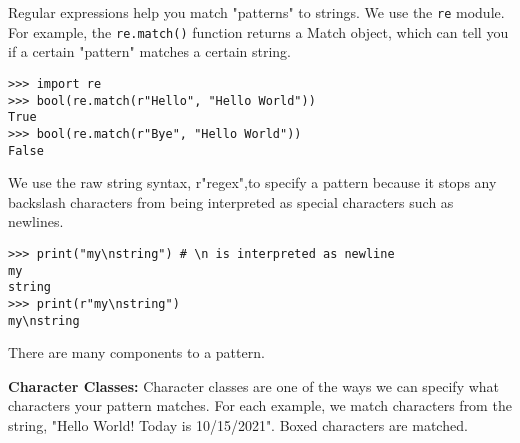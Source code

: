 Regular expressions help you match "patterns" to strings. We use the \lstinline{re} module.
For example, the \lstinline{re.match()} function returns a Match object, which can tell you if a certain "pattern" matches a certain string.

\begin{lstlisting}
>>> import re
>>> bool(re.match(r"Hello", "Hello World"))
True
>>> bool(re.match(r"Bye", "Hello World"))
False
\end{lstlisting}

We use the raw string syntax, r"regex",to specify a pattern because
it stops any backslash characters from being interpreted as special characters such as newlines.

\begin{lstlisting}
>>> print("my\nstring") # \n is interpreted as newline
my
string
>>> print(r"my\nstring")
my\nstring
\end{lstlisting}

There are many components to a pattern.

\newpage
\textbf{Character Classes:}
Character classes are one of the ways we can specify what characters your pattern matches.
For each example, we match characters from the string, "Hello World! Today is 10/15/2021".
Boxed characters are matched.

